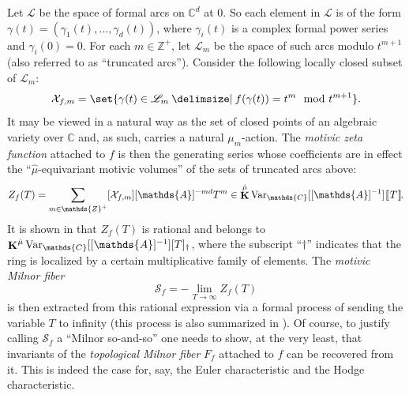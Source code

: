 \documentclass[12pt]{amsart}
\newcommand{\memph}[1]{{\color{magenta}\emph{#1}}}
\theoremstyle{plain}
\theoremstyle{definition}
\theoremstyle{remark}
\numberwithin{equation}{section}
\theoremstyle{plain}
\newcommand{\Z}{\mathds{Z}}
\newcommand{\A}{\mathds{A}}
\newcommand{\C}{\mathds{C}}
\newcommand{\0}{\emptyset}
\newcommand{\dbra}[1]{%
  \,[\mkern-6.8mu[\, #1 \,]\mkern-6.8mu]}
\newcommand{\mdl}[1]{\mathcal{#1}}  %
\newcommand{\limplies}{\rightarrow}
\providecommand\given{}
\newcommand\SetSymbol[1][]{%
\nonscript \: #1 \vert
\allowbreak
\nonscript\:
\mathopen{}}
\renewcommand\given{\SetSymbol[\delimsize]}
\DeclareMathOperator{\ggk}{\mathbf{K}}
\newcommand{\var}{\textup{Var}}
\newcommand{\gmv}{\ggk^{\hat \mu}\var_{\C}}
\begin{document}
Let $\mathscr L$ be the space of formal arcs on $\C^d$ at $0$. So each element in $\mathscr L$ is of the form $\gamma(t) = (\gamma_1(t), \ldots, \gamma_d(t))$, where $\gamma_i(t)$ is a complex formal power series and $\gamma_i(0) = 0$. For each $m \in \Z^+$, let $\mathscr L_m$ be the space of such arcs modulo $t^{m+1}$ (also referred to as ``truncated arcs''). Consider the following locally closed subset of $\mathscr L_m$:
\begin{equation*}
  \mdl X_{f,m}  = \set{\gamma(t) \in \mathscr L_m \given f(\gamma(t)) = t^m \mod t^{m+1} }.
\end{equation*}
It may be viewed in a natural way as the set of closed points of an algebraic variety over $\C$ and, as such, carries a natural $\mu_{m}$-action. The \memph{motivic zeta function} attached to $f$ is then the generating series whose coefficients are in effect the ``$\hat \mu$-equivariant motivic volumes'' of the sets of truncated arcs above:
\[
 Z_f(T) = \sum_{m \in \Z^+} [\mdl X_{f,m}] [\A]^{-md}T^m \in \gmv[[\A]^{-1}] \dbra{T}.
\]
It is  shown in \cite{denefloeser:arc, den:loe:2002} that $Z_f(T)$ is rational and belongs to $\gmv[[\A]^{-1}][T]_\dag$, where the subscript ``$\dag$'' indicates that the ring is localized by  a certain multiplicative family of elements. The \memph{motivic Milnor fiber}
\[
\mathscr S_{f} = - \lim_{T \limplies \infty} Z_{f}(T)
\]
is then extracted from this rational expression via a formal process of sending the variable $T$ to infinity (this process is also summarized in \cite[\S~8.4]{hru:loe:lef}). Of course, to justify calling $\mathscr S_{f}$ a ``Milnor so-and-so'' one needs to show, at the very least, that invariants of the \memph{topological Milnor fiber} $F_{f}$ attached to $f$ can be recovered from it.  This is indeed the case for, say, the Euler characteristic and the Hodge characteristic.
\end{document}
